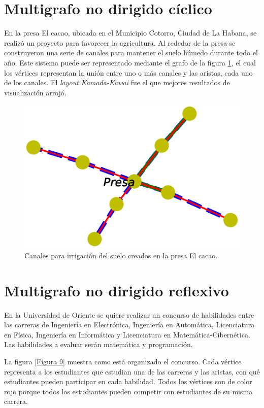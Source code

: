 \documentclass{article}
\begin{document}



\section{Multigrafo no dirigido cíclico}

En la presa El cacao, ubicada en el Municipio Cotorro, Ciudad de La Habana, se realizó un proyecto para favorecer la agricultura. Al rededor de la presa se construyeron una serie de canales para mantener el suelo húmedo durante todo el año.
Este sistema puede ser representado mediante el grafo de la figura \ref{Figura 8}, el cual los vértices representan la unión entre uno o más canales y las aristas, cada uno de los canales. El \textit{layout Kamada-Kawai} fue el que mejores resultados de visualización arrojó.

\begin{figure}
  \includegraphics[width=.8\columnwidth]{fig8.eps}
  \vspace*{-12mm}
  \caption{Canales para irrigación del suelo creados en la presa El cacao.}
  \label{Figura 8}
\end{figure}
\newpage



\section{Multigrafo no dirigido reflexivo}

En la Universidad de Oriente se quiere realizar un concurso de habilidades entre las carreras de Ingeniería en Electrónica, Ingeniería en Automática, Licenciatura en Física, Ingeniería en Informática y Licenciatura en Matemática-Cibernética. Las habilidades a evaluar serán matemática y programación. 

La figura \ref{Figura 9} muestra como está organizado el concurso. Cada vértice representa a los estudiantes que estudian una de las carreras y las aristas, con qué estudiantes pueden participar en cada habilidad. Todos los vértices son de color rojo porque todos los estudiantes pueden competir con estudiantes de su misma carrera.
\end{document}
